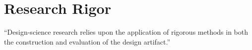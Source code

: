 \section{Research Rigor}
``Design-science research relies upon the application of rigorous methods in both the construction and evaluation of the design artifact.''

\begin{comment}

## Process

<!--
Flo: "I think it's interesting to describe the actual process, but you should not over-emphasize it. In the end, you came up with a design and an implementation, and that is the artifact you produced.

If you can show multiple iterations of your artifact with 'experiments' evaluating its appropriateness and refinements, fine - but don't zoom into the microscopic level (first I read this, then that, ...).

"

**argument:** feasibility wasn't clear to begin with!!! -> it's research

-->

1. peacemems notifies me of react
2. reading that, i also stumbled across flux
  * flux-article talks about problems with angular/bi-directional data-bindings resonates (same problems when debugging prev prototype) (?)
4. new ulf screens → we’ll need to rewrite (?)
4. rewriting with the old angular setup (angular 2 isn’t production ready)
4. pre-compilation (js, scss) and bundling setup
  * we also switched away from bootstrap, as we'd need to modify it’s styles that heavily anyway
4. actually: when stores and synching via the ws became a thing, started researching flux, ended up stumbling across redux (#342)
  * apparently, we were using flux even before that (see #342). it’s part of a commit from 23 Sep 2015 (1395ba6) and was only used to test with a draft store, so nvm.
  * and compared different implementations ( 	b824aa2)
6. read up on redux and ways to integrate with existing code-base
7. implementation
  * Frankangular - the Migration Process. Reducing angular to a rendering stage.
  * Frankangular - Duplicate imports :{
  * Migration:
      * Reducing bootstrap usage.
      * Promises: $q to native.
   * started with router and core reducers(?)
   * a lot of mocking → smooth collaboration
8. usability tests (?) not really part of architecture


\end{comment}
